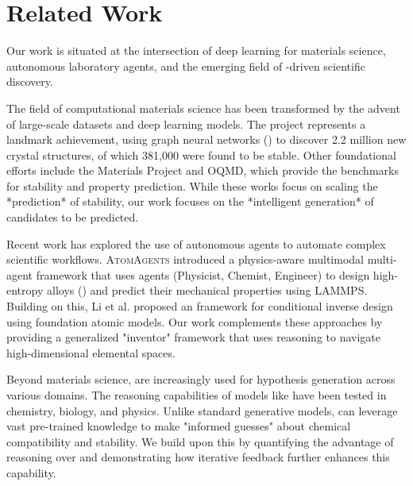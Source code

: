 \section{Related Work}
\label{sec:related}

Our work is situated at the intersection of deep learning for materials science, autonomous laboratory agents, and the emerging field of \llm-driven scientific discovery.

The field of computational materials science has been transformed by the advent of large-scale datasets and deep learning models. The \gnome project \cite{merchant2023scaling} represents a landmark achievement, using graph neural networks (\gnn) to discover 2.2 million new crystal structures, of which 381,000 were found to be stable. Other foundational efforts include the Materials Project and OQMD, which provide the benchmarks for stability and property prediction. While these works focus on scaling the *prediction* of stability, our work focuses on the *intelligent generation* of candidates to be predicted.

Recent work has explored the use of autonomous agents to automate complex scientific workflows. \textsc{AtomAgents} \cite{ghafarollahi2025automating} introduced a physics-aware multimodal multi-agent framework that uses \llm agents (Physicist, Chemist, Engineer) to design high-entropy alloys (\hea) and predict their mechanical properties using \textsc{LAMMPS}. Building on this, Li et al. \cite{li2025active} proposed an \activelearning framework for conditional inverse design using foundation atomic models. Our work complements these approaches by providing a generalized "inventor" framework that uses \llm reasoning to navigate high-dimensional elemental spaces.

Beyond materials science, \llms are increasingly used for hypothesis generation across various domains. The reasoning capabilities of models like \gpt have been tested in chemistry, biology, and physics. Unlike standard generative models, \llms can leverage vast pre-trained knowledge to make "informed guesses" about chemical compatibility and stability. We build upon this by quantifying the advantage of \llm reasoning over \randomsearch and demonstrating how iterative feedback further enhances this capability.
